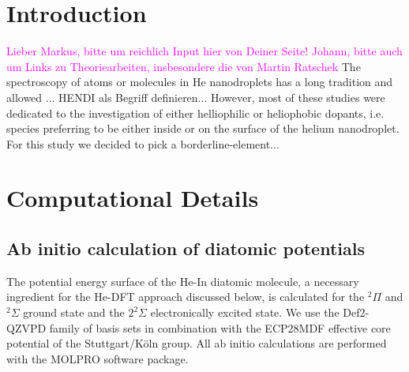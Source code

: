\documentclass[twoside,twocolumn,9pt]{article}
\def\hl#1{\textcolor{magenta}{#1}}  %
\begin{document}
\renewcommand*\rmdefault{bch}\normalfont\upshape
\rmfamily
\section*{}
\vspace{-1cm}





\section{Introduction}
\hl{Lieber Markus, bitte um reichlich Input hier von Deiner Seite! Johann, bitte auch um Links zu Theoriearbeiten, insbesondere die von Martin Ratschek}
The spectroscopy of atoms or molecules in He nanodroplets has a long tradition and allowed ... 
HENDI als Begriff definieren...
However, most of these studies were dedicated to the investigation of either helliophilic or heliophobic dopants, i.e. species preferring to be either inside or on the surface of the helium nanodroplet. 
For this study we decided to pick a borderline-element...


\section{Computational Details}

\subsection{Ab initio calculation of diatomic potentials}
\label{sec:ab}
The potential energy surface of the He-In diatomic molecule, a necessary ingredient for the He-DFT approach discussed below, is calculated for the $^2\Pi{}$ and $^2\Sigma$ ground state and the $2^2\Sigma{}$ electronically excited state. We use the Def2-QZVPD family of basis sets \cite{Rappoport2010} in combination with the ECP28MDF effective core potential of the Stuttgart/K\"oln group.\cite{Metz2000}  All ab initio calculations are performed with the MOLPRO software package.\cite{MOLPRO}
\end{document}
